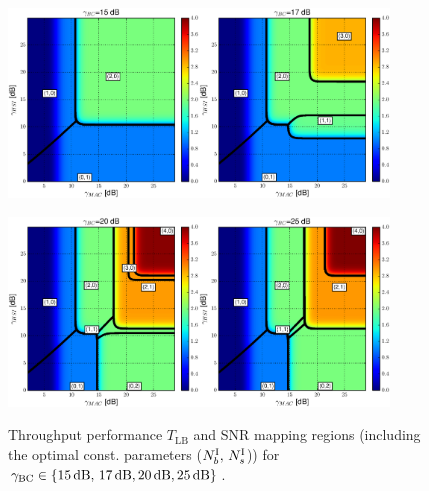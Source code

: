 \documentclass{article}
\begin{document}
\begin{figure}
\begin{centering}
\includegraphics[width=0.45\textwidth]{fig/XOR_map_Througput_BC15}\quad\includegraphics[width=0.45\textwidth]{fig/XOR_map_Througput_BC17}
\par\end{centering}

\centering{}\includegraphics[width=0.45\textwidth]{fig/XOR_map_Througput_BC20}\quad\includegraphics[width=0.45\textwidth]{fig/XOR_map_Througput_BC25}\caption{Throughput performance $T_{\mathrm{LB}}$ and SNR mapping regions
(including the optimal const. parameters ($N_{b}^{{\rm I}},\,N_{s}^{{\rm I}}$))
for $\gamma_{{\rm {BC}}}\in\{15\,\mathrm{dB},\,17\,\mathrm{dB},20\,\mathrm{dB},25\,\mathrm{dB}\}$.\label{fig:CTUpp_SNR_map_BC15-17-20-25}}
\end{figure}
\end{document}
